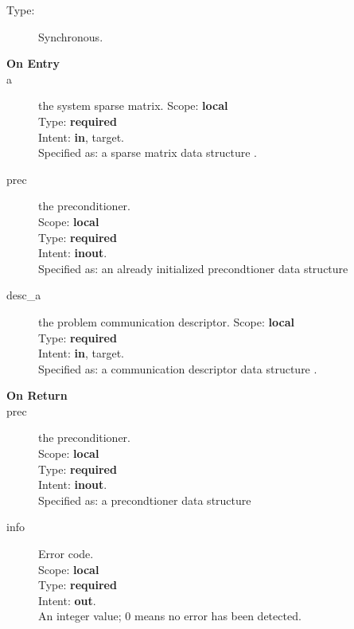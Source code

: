 

\begin{description}
\item[Type:] Synchronous.
\item[\bf On Entry]
\item[a] the system sparse matrix.
Scope: {\bf local} \\
Type: {\bf required}\\
Intent: {\bf in}, target.\\
Specified as: a sparse matrix data structure \spdata.
\item[prec] the preconditioner.\\
Scope: {\bf local} \\
Type: {\bf required}\\
Intent: {\bf inout}.\\
Specified as: an already initialized precondtioner data structure \precdata\\
\item[desc\_a] the problem communication descriptor. 
Scope: {\bf local} \\
Type: {\bf required}\\
Intent: {\bf in}, target.\\
Specified as: a communication descriptor data structure \descdata.
\end{description}

\begin{description}
\item[\bf On Return]
\item[prec] the preconditioner.\\
Scope: {\bf local} \\
Type: {\bf required}\\
Intent: {\bf inout}.\\
Specified as: a precondtioner data structure \precdata\\
\item[info] Error code.\\
Scope: {\bf local} \\
Type: {\bf required} \\
Intent: {\bf out}.\\
An integer value; 0 means no error has been detected. 
\end{description}


